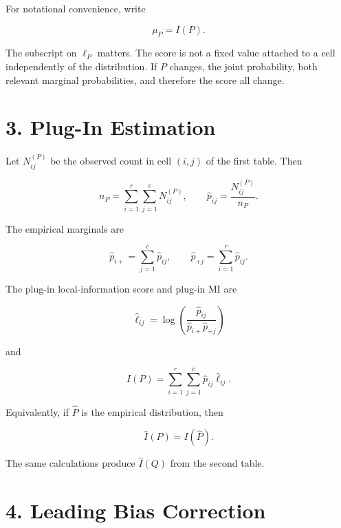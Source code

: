 \documentclass[
  11pt]{article}
\let\originalsection\section
\renewcommand{\section}{\clearpage\originalsection}
\begin{document}
For notational convenience, write

\begin{equation}
\mu_P=I(P).
\end{equation}

The subscript on \(\ell_P\) matters. The score is not a fixed value
attached to a cell independently of the distribution. If \(P\) changes,
the joint probability, both relevant marginal probabilities, and
therefore the score all change.

\section{3. Plug-In Estimation}\label{plug-in-estimation}

Let \(N_{ij}^{(P)}\) be the observed count in cell \((i,j)\) of the
first table. Then

\begin{equation}
n_P=\sum_{i=1}^{r}\sum_{j=1}^{c}N_{ij}^{(P)},
\qquad
\widehat p_{ij}=\frac{N_{ij}^{(P)}}{n_P}.
\end{equation}

The empirical marginals are

\begin{equation}
\widehat p_{i+}=\sum_{j=1}^{c}\widehat p_{ij},
\qquad
\widehat p_{+j}=\sum_{i=1}^{r}\widehat p_{ij}.
\end{equation}

The plug-in local-information score and plug-in MI are

\begin{equation}
\widehat\ell_{ij}
=\log\left(
\frac{\widehat p_{ij}}
{\widehat p_{i+}\widehat p_{+j}}
\right)
\end{equation}

and

\begin{equation}
\widehat I(P)
=\sum_{i=1}^{r}\sum_{j=1}^{c}
\widehat p_{ij}\widehat\ell_{ij}.
\end{equation}

Equivalently, if \(\widehat P\) is the empirical distribution, then

\begin{equation}
\widehat I(P)=I(\widehat P).
\end{equation}

The same calculations produce \(\widehat I(Q)\) from the second table.

\section{4. Leading Bias Correction}\label{leading-bias-correction}
\end{document}

